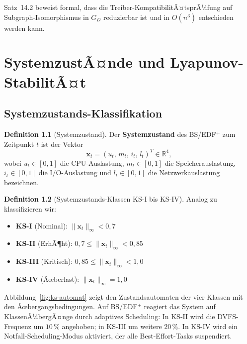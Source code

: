 ﻿\documentclass[a4paper,12pt]{scrreprt}
\theoremstyle{definition}
\newtheorem{definition}{Definition}[chapter]
\begin{document}
	Satz~14.2 beweist formal, dass die Treiber-KompatibilitÃ¤tsprÃ¼fung
	auf Subgraph-Isomor\-phismus in $G_D$ reduzierbar ist und in $O(n^3)$
	entschieden werden kann.
	
	\chapter{SystemzustÃ¤nde und Lyapunov-StabilitÃ¤t}
	
	\section{Systemzustands-Klassifikation}

	\begin{definition}[Systemzustand]
		Der \textbf{Systemzustand} des BS/EDF$^+$ zum Zeitpunkt $t$ ist der
		Vektor
		\[
		\mathbf{x}_t = (u_t,\, m_t,\, i_t,\, l_t)^T \in \mathbb{R}^4,
		\]
		wobei $u_t \in [0,1]$ die CPU-Auslastung, $m_t \in [0,1]$ die
		Speicherauslastung, $i_t \in [0,1]$ die I/O-Auslastung und
		$l_t \in [0,1]$ die Netzwerkauslastung bezeichnen.
	\end{definition}

	\begin{definition}[Systemzustands-Klassen KS-I bis KS-IV]
		Analog zu \cite{Epp2026sysstate} klassifizieren wir:
		\begin{itemize}
			\item \textbf{KS-I} (Nominal): $\|\mathbf{x}_t\|_\infty < 0{,}7$
			\item \textbf{KS-II} (ErhÃ¶ht): $0{,}7 \leq \|\mathbf{x}_t\|_\infty < 0{,}85$
			\item \textbf{KS-III} (Kritisch): $0{,}85 \leq \|\mathbf{x}_t\|_\infty < 1{,}0$
			\item \textbf{KS-IV} (Ãœberlast): $\|\mathbf{x}_t\|_\infty = 1{,}0$
		\end{itemize}
	\end{definition}

	Abbildung~\ref{fig:ks-automat} zeigt den Zustandsautomaten der vier
	Klassen mit den Ãœbergangsbedingungen. Auf BS/EDF$^+$ reagiert das
	System auf KlassenÃ¼bergÃ¤nge durch adaptives Scheduling: In KS-II wird
	die DVFS-Frequenz um $10\,\%$ angehoben; in KS-III um weitere $20\,\%$.
	In KS-IV wird ein Notfall-Scheduling-Modus aktiviert, der alle
	Best-Effort-Tasks suspendiert.
\end{document}
